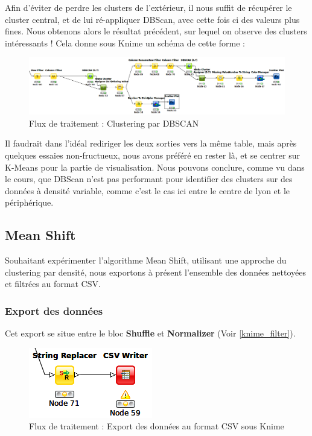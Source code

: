 Afin d'éviter de perdre les clusters de l'extérieur, il nous suffit de récupérer le cluster central, et de lui ré-appliquer DBScan, avec cette fois ci des valeurs plus fines. Nous obtenons alors le résultat précédent, sur lequel on observe des clusters intéressants !
Cela donne sous Knime un schéma de cette forme :

\begin{figure}[H]
    \centering
    \includegraphics[width=\linewidth]{img/knime_dbscan.png}
    \caption{Flux de traitement : Clustering par DBSCAN}
\end{figure}

Il faudrait dans l'idéal rediriger les deux sorties vers la même table, mais après quelques essaies non-fructueux, nous avons préféré en rester là, et se centrer sur K-Means pour la partie de visualisation.
Nous pouvons conclure, comme vu dans le cours, que DBScan n'est pas performant pour identifier des clusters sur des données à densité variable, comme c'est le cas ici entre le centre de lyon et le périphérique.

\pagebreak




\subsection{Mean Shift}
Souhaitant expérimenter l'algorithme Mean Shift, utilisant une approche du clustering par densité, nous exportons à présent l'ensemble des données nettoyées et filtrées au format CSV.

\subsubsection{Export des données}
Cet export se situe entre le bloc \textbf{Shuffle} et \textbf{Normalizer} (Voir \ref{knime_filter}).

\begin{figure}[H]
    \centering
    \includegraphics[width=0.25\linewidth]{img/knime_csvwriter.png}
    \caption{Flux de traitement : Export des données au format CSV sous Knime}
\end{figure}

